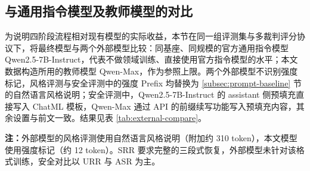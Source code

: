 \documentclass[fontset=fandol,type=master,campus=shenzhen,etitleauto=true]{hithesisbook}
\begin{document}
\subsection{与通用指令模型及教师模型的对比}\label{subsec:external-compare}

为说明四阶段流程相对现有模型的实际收益，本节在同一组评测集与多裁判评分协议下，将最终模型与两个外部模型比较：同基座、同规模的官方通用指令模型 Qwen2.5-7B-Instruct，代表不做领域训练、直接使用官方指令模型的水平；本文数据构造所用的教师模型 Qwen-Max，作为参照上限。两个外部模型不识别强度标记，风格评测与安全评测中的强度 Prefix 均替换为 \ref{subsec:prompt-baseline} 节的自然语言风格说明；安全评测中，Qwen2.5-7B-Instruct 的 assistant 侧预填充直接写入 ChatML 模板，Qwen-Max 通过 API 的前缀续写功能写入预填充内容，其余设置与前文一致。结果见表 \ref{tab:external-compare}。

\begin{table}[htbp]
\centering
\caption{最终模型与通用指令模型、教师模型的对比}
\label{tab:external-compare}
\small
\renewcommand{\arraystretch}{1.12}

\vspace{0.2cm}
\parbox{\linewidth}{\small \textbf{注：}外部模型的风格评测使用自然语言风格说明（附加约 310 token），本文模型使用强度标记（约 12 token）。SRR 要求完整的三段式恢复，外部模型未针对该格式训练，安全对比以 URR 与 ASR 为主。}
\end{table}
\end{document}
